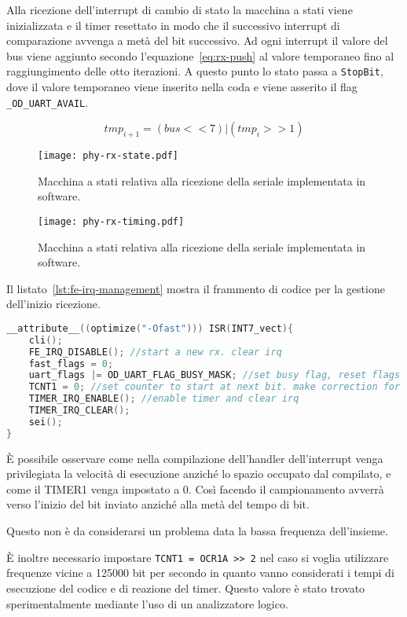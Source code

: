 Alla ricezione dell'interrupt di cambio di stato la macchina a stati viene inizializzata e il timer resettato in modo che il successivo interrupt di comparazione avvenga a metà del bit successivo. Ad ogni interrupt il valore del bus viene aggiunto secondo l'equazione~\ref{eq:rx-push} al valore temporaneo fino al raggiungimento delle otto iterazioni. A questo punto lo stato passa a \texttt{StopBit}, dove il valore temporaneo viene inserito nella coda e viene asserito il flag \texttt{\_OD\_UART\_AVAIL}.

\begin{equation}\label{eq:rx-push}
    tmp_{i+1} = (bus << 7) | (tmp_i >> 1)
\end{equation}

\begin{figure}[p]
    \centering
    \texttt{[image: phy-rx-state.pdf]}
    \caption[]{Macchina a stati relativa alla ricezione della seriale implementata in software.}\label{fig:phy-rx-state}
\end{figure}

\begin{figure}[p]
    \centering
    \texttt{[image: phy-rx-timing.pdf]}
    \caption[]{Macchina a stati relativa alla ricezione della seriale implementata in software.}\label{fig:phy-rx-timing}
\end{figure}

Il listato~\ref{lst:fe-irq-management} mostra il frammento di codice per la gestione dell'inizio ricezione. 

\noindent\begin{minipage}{\textwidth}
    \begin{lstlisting}[language=C, caption={IRQ di gestione inizio trasmissione}, label=lst:fe-irq-management]
__attribute__((optimize("-Ofast"))) ISR(INT7_vect){
    cli();
    FE_IRQ_DISABLE(); //start a new rx. clear irq
    fast_flags = 0;
    uart_flags |= OD_UART_FLAG_BUSY_MASK; //set busy flag, reset flags
    TCNT1 = 0; //set counter to start at next bit. make correction for timer startup and bad things.
    TIMER_IRQ_ENABLE(); //enable timer and clear irq
    TIMER_IRQ_CLEAR();
    sei();
}
    \end{lstlisting}
\end{minipage}

È possibile osservare come nella compilazione dell'handler dell'interrupt venga privilegiata la velocità di esecuzione anziché lo spazio occupato dal compilato, e come il TIMER1 venga impostato a 0. Così facendo il campionamento avverrà verso l'inizio del bit inviato anziché alla metà del tempo di bit. 

Questo non è da considerarsi un problema data la bassa frequenza dell'insieme.

È inoltre necessario impostare \texttt{TCNT1 = OCR1A >\textcompwordmark> 2} nel caso si voglia utilizzare frequenze vicine a 125000 bit per secondo in quanto vanno considerati i tempi di esecuzione del codice e di reazione del timer. Questo valore è stato trovato sperimentalmente mediante l'uso di un analizzatore logico.